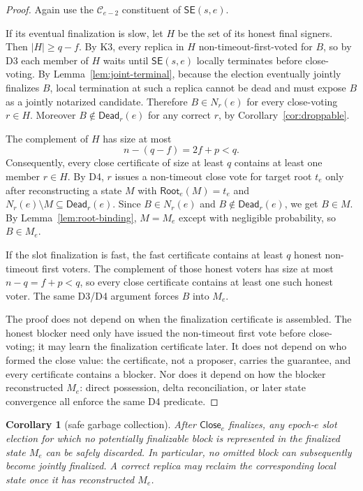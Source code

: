 \documentclass[11pt]{article}
\newtheorem{corollary}{Corollary}
\theoremstyle{remark}
\newcommand{\C}{\mathcal{C}}
\newcommand{\SE}{\mathsf{SE}}
\newcommand{\CE}{\mathsf{Close}}
\newcommand{\Dead}{\mathsf{Dead}}
\newcommand{\Root}{\mathsf{Root}}
\begin{document}
\begin{proof}
Again use the $\C_{e-2}$ constituent of $\SE(s,e)$.

If its eventual finalization is slow, let $H$ be the set of its honest final signers. Then $|H|\ge q-f$. By K3, every replica in $H$ non-timeout-first-voted for $B$, so by D3 each member of $H$ waits until $\SE(s,e)$ locally terminates before close-voting. By Lemma~\ref{lem:joint-terminal}, because the election eventually jointly finalizes $B$, local termination at such a replica cannot be dead and must expose $B$ as a jointly notarized candidate. Therefore $B\in N_r(e)$ for every close-voting $r\in H$. Moreover $B\notin\Dead_r(e)$ for any correct $r$, by Corollary~\ref{cor:droppable}.

The complement of $H$ has size at most
\[
  n-(q-f)=2f+p<q.
\]
Consequently, every close certificate of size at least $q$ contains at least one member $r\in H$. By D4, $r$ issues a non-timeout close vote for target root $t_e$ only after reconstructing a state $M$ with $\Root_e(M)=t_e$ and $N_r(e)\setminus M\subseteq\Dead_r(e)$. Since $B\in N_r(e)$ and $B\notin\Dead_r(e)$, we get $B\in M$. By Lemma~\ref{lem:root-binding}, $M=M_e$ except with negligible probability, so $B\in M_e$.

If the slot finalization is fast, the fast certificate contains at least $q$ honest non-timeout first voters. The complement of those honest voters has size at most $n-q=f+p<q$, so every close certificate contains at least one such honest voter. The same D3/D4 argument forces $B$ into $M_e$.

The proof does not depend on when the finalization certificate is assembled. The honest blocker need only have issued the non-timeout first vote before close-voting; it may learn the finalization certificate later. It does not depend on who formed the close value: the certificate, not a proposer, carries the guarantee, and every certificate contains a blocker. Nor does it depend on how the blocker reconstructed $M_e$: direct possession, delta reconciliation, or later state convergence all enforce the same D4 predicate.
\end{proof}

\begin{corollary}[safe garbage collection]
\label{cor:gc}
After $\CE_e$ finalizes, any epoch-$e$ slot election for which no potentially finalizable block is represented in the finalized state $M_e$ can be safely discarded. In particular, no omitted block can subsequently become jointly finalized. A correct replica may reclaim the corresponding local state once it has reconstructed $M_e$.
\end{corollary}
\end{document}
